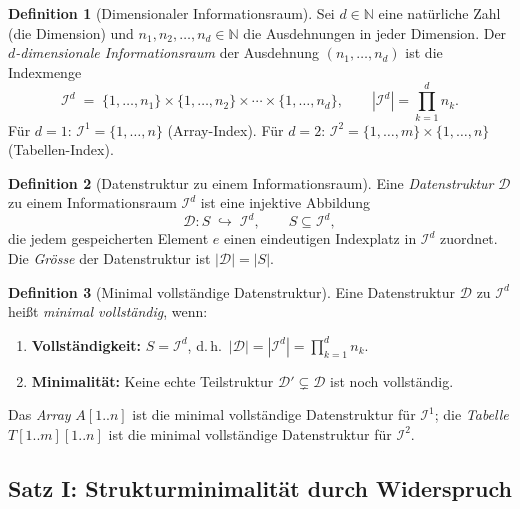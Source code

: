 ﻿\documentclass[a4paper,12pt]{article}
\theoremstyle{definition}
\newtheorem{definition}{Definition}
\begin{document}
\begin{definition}[Dimensionaler Informationsraum]
    \label{def:dimraum}
    Sei $d \in \mathbb{N}$ eine nat\"{u}rliche Zahl (die Dimension) und
    $n_1, n_2, \ldots, n_d \in \mathbb{N}$ die Ausdehnungen in jeder Dimension.
    Der \emph{$d$-dimensionale Informationsraum} der Ausdehnung
    $(n_1, \ldots, n_d)$ ist die Indexmenge
    \[
        \mathcal{I}^d \;=\;
        \{1, \ldots, n_1\} \times \{1, \ldots, n_2\} \times \cdots
        \times \{1, \ldots, n_d\},
        \qquad |\mathcal{I}^d| = \prod_{k=1}^{d} n_k.
    \]
    F\"{u}r $d = 1$: $\mathcal{I}^1 = \{1, \ldots, n\}$ (Array-Index).
    F\"{u}r $d = 2$: $\mathcal{I}^2 = \{1, \ldots, m\} \times \{1, \ldots, n\}$
    (Tabellen-Index).
\end{definition}

\begin{definition}[Datenstruktur zu einem Informationsraum]
    Eine \emph{Datenstruktur} $\mathcal{D}$ zu einem Informationsraum $\mathcal{I}^d$
    ist eine injektive Abbildung
    \[
        \mathcal{D}: S \;\hookrightarrow\; \mathcal{I}^d,
        \qquad S \subseteq \mathcal{I}^d,
    \]
    die jedem gespeicherten Element $e$ einen eindeutigen Indexplatz in
    $\mathcal{I}^d$ zuordnet. Die \emph{Gr\"{o}sse} der Datenstruktur ist
    $|\mathcal{D}| = |S|$.
\end{definition}

\begin{definition}[Minimal vollst\"{a}ndige Datenstruktur]
    \label{def:minimal}
    Eine Datenstruktur $\mathcal{D}$ zu $\mathcal{I}^d$ hei\ss{}t
    \emph{minimal vollst\"{a}ndig}, wenn:
    \begin{enumerate}
        \item \textbf{Vollst\"{a}ndigkeit:} $S = \mathcal{I}^d$, d.\,h.\
              $|\mathcal{D}| = |\mathcal{I}^d| = \prod_{k=1}^d n_k$.
        \item \textbf{Minimalit\"{a}t:} Keine echte Teilstruktur
              $\mathcal{D}' \subsetneq \mathcal{D}$ ist noch vollst\"{a}ndig.
    \end{enumerate}
    Das \emph{Array} $A[1..n]$ ist die minimal vollst\"{a}ndige Datenstruktur
    f\"{u}r $\mathcal{I}^1$; die \emph{Tabelle} $T[1..m][1..n]$ ist die minimal
    vollst\"{a}ndige Datenstruktur f\"{u}r $\mathcal{I}^2$.
\end{definition}

\subsection{Satz I: Strukturminimalit\"{a}t durch Widerspruch}
\end{document}

